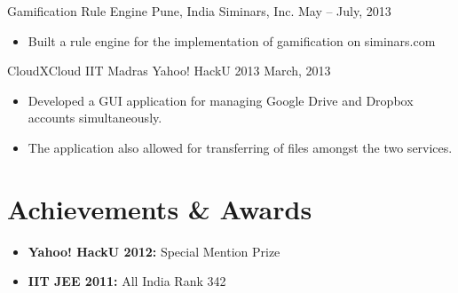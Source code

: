 \documentclass[letterpaper,11pt]{resume}
\begin{document}
\begin{itemize}
   \credential
    {{Gamification Rule Engine}}
    {Pune, India}
    {{Siminars, Inc.}}
    {May -- July, 2013}
 { \begin{itemize}
      \item{Built a rule engine for the implementation of gamification on siminars.com}
      \end{itemize}
    }
   \credential
    {{CloudXCloud}}
    {IIT Madras}
    {{Yahoo! HackU 2013}}
    {March, 2013} 
    {\begin{itemize}
     \item Developed a GUI application for managing Google Drive and Dropbox accounts simultaneously.
     \item The application also allowed for transferring of files amongst the two services.
    \end{itemize}
}
   
   
\end{itemize}



\section{Achievements \& Awards}
\begin{itemize}
  \item {\bf Yahoo! HackU 2012:} Special Mention Prize   
  \item {\bf IIT JEE 2011: }All India Rank 342 
  \end{itemize}  %
\end{document}
